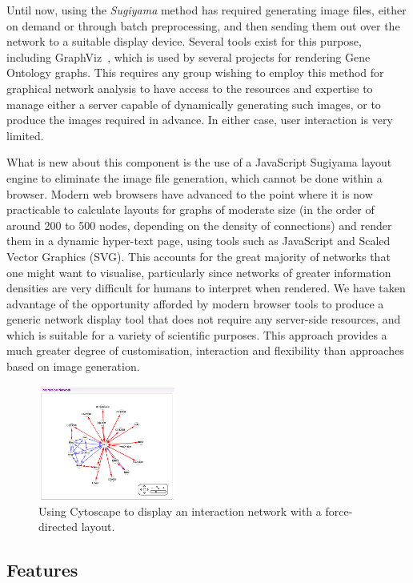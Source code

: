\documentclass[10pt,a4paper,twocolumn]{article}
\begin{document}
Until now, using the \emph{Sugiyama} method has required generating image files,
either on demand or through batch preprocessing, and then sending them out over
the network to a suitable display device. Several tools exist for this purpose,
including GraphViz~\cite{graphviz}, which is used by several projects for
rendering Gene Ontology graphs. This requires any group wishing to employ
this method for graphical network analysis to have access to the resources and
expertise to manage either a server capable of dynamically generating such
images, or to produce the images required in advance. In either case, user
interaction is very limited.

What is new about this component is the use of a JavaScript Sugiyama layout
engine to eliminate the image file generation, which cannot be done within a
browser. Modern web browsers have advanced to the point where it is now
practicable to calculate layouts for graphs of moderate size (in the order of
around 200 to 500 nodes, depending on the density of connections) and render
them in a dynamic hyper-text page, using tools such as JavaScript and Scaled
Vector Graphics (SVG). This accounts for the great majority of networks that one
might want to visualise, particularly since networks of greater information
densities are very difficult for humans to interpret when rendered. We have
taken advantage of the opportunity afforded by modern browser tools to produce a
generic network display tool that does not require any server-side resources,
and which is suitable for a variety of scientific purposes. This approach
provides a much greater degree of customisation, interaction and flexibility
than approaches based on image generation.

\begin{figure}[htb]
\centering
\includegraphics[width=0.4\textwidth]{force-directed.png}
\caption{
    \label{fig:force-directed}
    Using Cytoscape to display an interaction network with a force-directed layout.
}
\end{figure}

\subsection*{Features}
\end{document}
